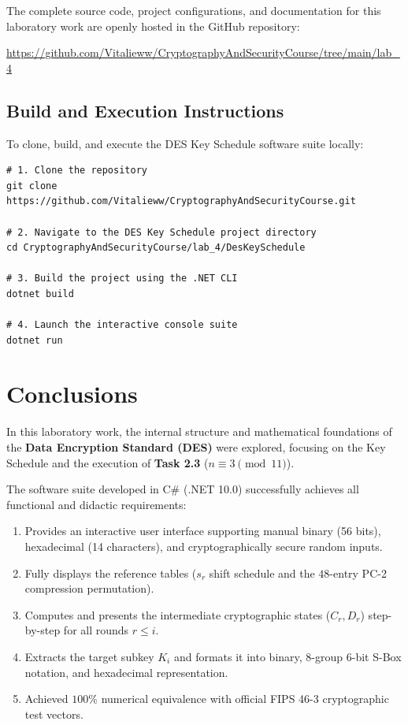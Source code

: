 \documentclass[12pt,a4paper]{article}
\begin{document}
The complete source code, project configurations, and documentation for this laboratory work are openly hosted in the GitHub repository:
\begin{center}
    \large
    \url{https://github.com/Vitalieww/CryptographyAndSecurityCourse/tree/main/lab_4}
\end{center}

\subsection{Build and Execution Instructions}
To clone, build, and execute the DES Key Schedule software suite locally:
\begin{lstlisting}[numbers=none,basicstyle=\small\ttfamily]
# 1. Clone the repository
git clone https://github.com/Vitalieww/CryptographyAndSecurityCourse.git

# 2. Navigate to the DES Key Schedule project directory
cd CryptographyAndSecurityCourse/lab_4/DesKeySchedule

# 3. Build the project using the .NET CLI
dotnet build

# 4. Launch the interactive console suite
dotnet run
\end{lstlisting}

\section{Conclusions}

In this laboratory work, the internal structure and mathematical foundations of the \textbf{Data Encryption Standard (DES)} were explored, focusing on the Key Schedule and the execution of \textbf{Task 2.3} ($n \equiv 3 \pmod{11}$).

The software suite developed in C\# (.NET 10.0) successfully achieves all functional and didactic requirements:
\begin{enumerate}
    \item Provides an interactive user interface supporting manual binary (56 bits), hexadecimal (14 characters), and cryptographically secure random inputs.
    \item Fully displays the reference tables ($s_r$ shift schedule and the $48$-entry PC-2 compression permutation).
    \item Computes and presents the intermediate cryptographic states ($C_r, D_r$) step-by-step for all rounds $r \le i$.
    \item Extracts the target subkey $K_i$ and formats it into binary, 8-group 6-bit S-Box notation, and hexadecimal representation.
    \item Achieved $100\%$ numerical equivalence with official FIPS 46-3 cryptographic test vectors.
\end{enumerate}
\end{document}
